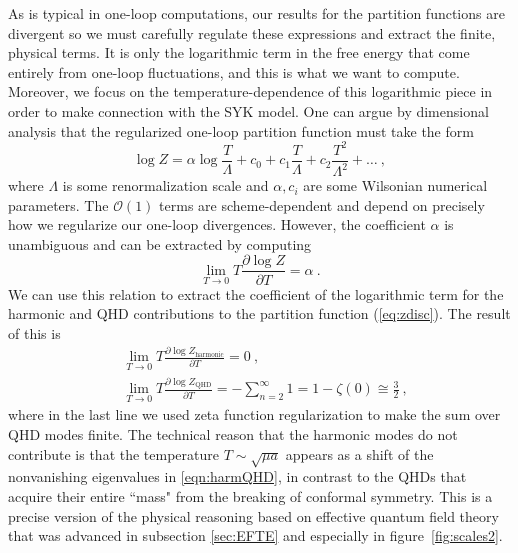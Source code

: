 \documentclass[12pt]{article}
\begin{document}
As is typical in one-loop computations, our results for the partition functions are divergent so we must carefully regulate these expressions and extract the finite, physical terms.  It is only the logarithmic term in the free energy that come entirely from one-loop fluctuations, and this is what we want to compute.  Moreover, we focus on the temperature-dependence of this logarithmic piece in order to make connection with the SYK model.  One can argue by dimensional analysis that the regularized one-loop partition function must take the form
\begin{equation}
	\log Z = \alpha \log \frac{T}{\Lambda} + c_0 + c_1 \frac{T}{\Lambda} + c_2 \frac{T^2}{\Lambda^2} + \ldots~,
\label{eq:zexp}
\end{equation}
where $\Lambda$ is some renormalization scale and $\alpha, c_i$ are some Wilsonian numerical parameters. The $\mathcal{O}(1)$ terms are scheme-dependent and depend on precisely how we regularize our one-loop divergences. However, the coefficient $\alpha$ is unambiguous and can be extracted by computing
\begin{equation}
	\lim_{T\to 0} T \frac{\partial \log Z}{\partial T} = \alpha~.
\end{equation}
We can use this relation to extract the coefficient of the logarithmic term for the harmonic and QHD contributions to the partition function 
(\ref{eq:zdisc}).  The result of this is
\begin{equation}\begin{aligned}
	&\lim_{T\to 0} T \frac{\partial \log Z_\text{harmonic}}{\partial T} = 0~, \\
	&\lim_{T\to 0} T \frac{\partial \log Z_\text{QHD}}{\partial T} = - \sum_{n=2}^\infty 1 = 1 - \zeta(0) \cong \frac{3}{2}~,
	\label{eqn:finalcomp}
\end{aligned}\end{equation}
where in the last line we used zeta function regularization to make the sum over QHD modes finite. The technical reason that the harmonic modes do not contribute is that the temperature $T\sim \sqrt{\mu a}$ appears as a shift of the nonvanishing eigenvalues in \eqref{eqn:harmQHD}, in contrast to the QHDs that acquire their entire ``mass" from the breaking of conformal symmetry. 
This is a precise version of the physical reasoning based on effective quantum field theory that was advanced in subsection \ref{sec:EFTE} and especially in figure~\ref{fig:scales2}.
\end{document}

